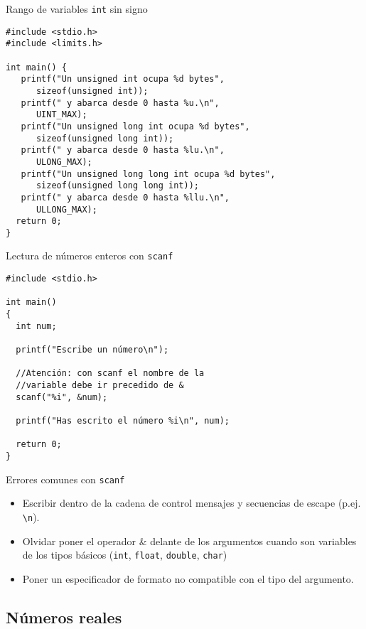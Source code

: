 \documentclass[xcolor={usenames,svgnames,dvipsnames}, aspectratio=169]{beamer}
\begin{document}
\begin{frame}[label={sec:org6fb7212},fragile,plain]{Rango de variables \texttt{int} sin signo}
 \lstset{language=C,label= ,caption= ,captionpos=b,numbers=none}
\begin{lstlisting}
#include <stdio.h>
#include <limits.h>

int main() {
   printf("Un unsigned int ocupa %d bytes",
	  sizeof(unsigned int));
   printf(" y abarca desde 0 hasta %u.\n",
	  UINT_MAX);
   printf("Un unsigned long int ocupa %d bytes",
	  sizeof(unsigned long int));
   printf(" y abarca desde 0 hasta %lu.\n",
	  ULONG_MAX);
   printf("Un unsigned long long int ocupa %d bytes",
	  sizeof(unsigned long long int));
   printf(" y abarca desde 0 hasta %llu.\n",
	  ULLONG_MAX);
  return 0;
}
\end{lstlisting}
\end{frame}


\begin{frame}[label={sec:orgecc5370},fragile]{Lectura de números enteros con \texttt{scanf}}
 \lstset{language=C,label= ,caption= ,captionpos=b,numbers=none}
\begin{lstlisting}
#include <stdio.h>

int main()
{
  int num;

  printf("Escribe un número\n");

  //Atención: con scanf el nombre de la 
  //variable debe ir precedido de &
  scanf("%i", &num);

  printf("Has escrito el número %i\n", num);

  return 0;
}
\end{lstlisting}
\end{frame}

\begin{frame}[label={sec:orga79aff9},fragile]{Errores comunes con \texttt{scanf}}
 \begin{itemize}
\item Escribir dentro de la cadena de control mensajes y secuencias de escape (p.ej. \texttt{\textbackslash{}n}).
\item Olvidar poner el operador \alert{\&} delante de los argumentos cuando son variables de los tipos básicos (\texttt{int}, \texttt{float}, \texttt{double}, \texttt{char})
\item Poner un especificador de formato no compatible con el tipo del argumento.
\end{itemize}
\end{frame}

\subsection{Números reales}
\label{sec:org221760a}
\end{document}
